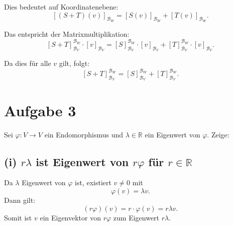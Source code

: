 \documentclass{article}
\begin{document}
Dies bedeutet auf Koordinatenebene:
\[
[(S+T)(v)]_{\mathcal{B}_W} = [S(v)]_{\mathcal{B}_W} + [T(v)]_{\mathcal{B}_W}.
\]

Das entspricht der Matrixmultiplikation:
\[
[S+T]_{\mathcal{B}_V}^{\mathcal{B}_W} \cdot [v]_{\mathcal{B}_V} = [S]_{\mathcal{B}_V}^{\mathcal{B}_W} \cdot [v]_{\mathcal{B}_V} + [T]_{\mathcal{B}_V}^{\mathcal{B}_W} \cdot [v]_{\mathcal{B}_V}.
\]

Da dies für alle \( v \) gilt, folgt:
\[
[S+T]_{\mathcal{B}_V}^{\mathcal{B}_W} = [S]_{\mathcal{B}_V}^{\mathcal{B}_W} + [T]_{\mathcal{B}_V}^{\mathcal{B}_W}.
\]

\section*{Aufgabe 3}

Sei \( \varphi : V \to V \) ein Endomorphismus und \( \lambda \in \mathbb{R} \) ein Eigenwert von \( \varphi \). Zeige:

\subsection*{(i) \( r\lambda \) ist Eigenwert von \( r\varphi \) für \( r \in \mathbb{R} \)}

Da \( \lambda \) Eigenwert von \( \varphi \) ist, existiert \( v \neq 0 \) mit
\[
\varphi(v) = \lambda v.
\]
Dann gilt:
\[
(r\varphi)(v) = r \cdot \varphi(v) = r \lambda v.
\]
Somit ist \( v \) ein Eigenvektor von \( r\varphi \) zum Eigenwert \( r\lambda \).
\end{document}
